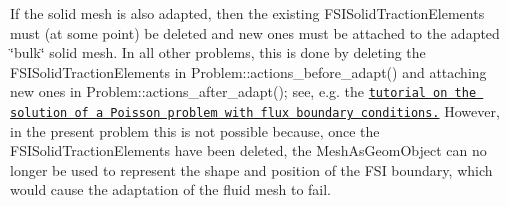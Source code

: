 If the solid mesh is also adapted, then the existing {\ttfamily F\+S\+I\+Solid\+Traction\+Elements} must (at some point) be deleted and new ones must be attached to the adapted \char`\"{}bulk\char`\"{} solid mesh. In all other problems, this is done by deleting the {\ttfamily F\+S\+I\+Solid\+Traction\+Elements} in {\ttfamily Problem\+::actions\+\_\+before\+\_\+adapt()} and attaching new ones in {\ttfamily Problem\+::actions\+\_\+after\+\_\+adapt()}; see, e.\+g. the \href{../../../poisson/two_d_poisson_flux_bc/html/index.html}{\tt tutorial on the solution of a Poisson problem with flux boundary conditions.} However, in the present problem this is not possible because, once the {\ttfamily F\+S\+I\+Solid\+Traction\+Elements} have been deleted, the {\ttfamily Mesh\+As\+Geom\+Object} can no longer be used to represent the shape and position of the F\+SI boundary, which would cause the adaptation of the fluid mesh to fail.


